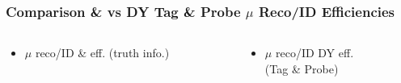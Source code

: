 \documentclass{beamer}
\begin{document}
\begin{frame}
 \frametitle{Comparison \ttbar \& \wpj vs DY Tag \& Probe $\mu$ Reco/ID Efficiencies}
   \begin{columns}

   \begin{column}{0.33\textwidth}
     \begin{itemize}
   \item $\mu$ reco/ID \ttbar \& \wpj eff. (truth info.)
  \end{itemize}
   \end{column}
   \begin{column}{0.33\textwidth}
   \begin{itemize}
    \item $\mu$ reco/ID DY eff. \\(Tag \& Probe)
   \end{itemize}


\end{column}
\end{columns}
\end{frame}
\end{document}
